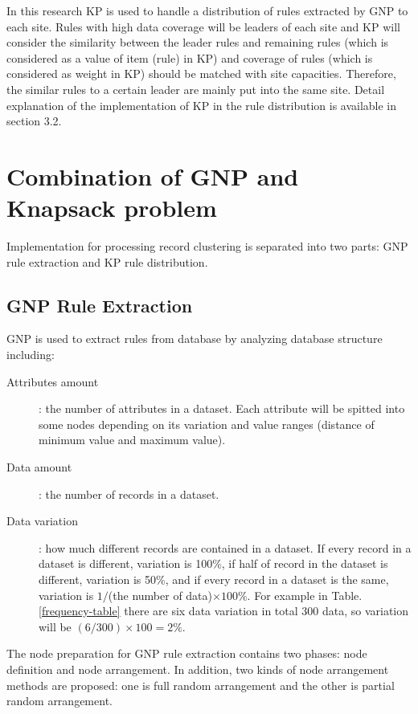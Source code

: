 \documentclass[fleqn,10pt,twocolumn]{SICE14}
\begin{document}
In this research KP is used to handle a distribution of rules extracted by GNP to each site. Rules with high data coverage will be leaders of each site and KP will consider the similarity between the leader rules and remaining rules (which is considered as a value of item (rule) in KP) and coverage of rules (which is considered as weight in KP) should be matched with site capacities. Therefore, the similar rules to a certain leader are mainly put into the same site.
Detail explanation of the implementation of KP in the rule distribution is available in section 3.2.

\section{Combination of GNP and Knapsack problem}

Implementation for processing record clustering is separated into two parts: GNP rule extraction and KP rule distribution.

\subsection{GNP Rule Extraction}

GNP is used to extract rules from database by analyzing database structure including:
\begin{description}
\item [Attributes amount]: the number of attributes in a dataset. Each attribute will be spitted into some nodes depending on its variation and value ranges (distance of minimum value and maximum value). 
\item [Data amount]: the number of records in a dataset.
\item [Data variation]: how much different records are contained in a dataset. If every record in a dataset is different, variation is 100\%, if half of record in the dataset is different, variation is 50\%, and if every record in a dataset is the same, variation is $1/$(the number of data)$ \times 100\%$. For example in Table. \ref{frequency-table} there are six data variation in total 300 data, so variation will be $(6/300)\times100=2\%$.
\end{description}
The node preparation for GNP rule extraction contains two phases: node definition and node arrangement. In addition, two kinds of node arrangement methods are proposed: one is full random arrangement and the other is partial random arrangement.
\end{document}
